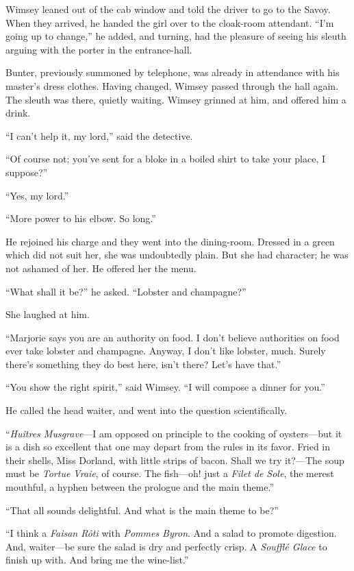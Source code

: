 Wimsey leaned out of the cab window and told the driver to go to the Savoy. When they arrived, he handed the girl over to the cloak-room attendant. \enquote{I'm going up to change,} he added, and turning, had the pleasure of seeing his sleuth arguing with the porter in the entrance-hall.

Bunter, previously summoned by telephone, was already in attendance with his master's dress clothes. Having changed, Wimsey passed through the hall again. The sleuth was there, quietly waiting. Wimsey grinned at him, and offered him a drink.

\enquote{I can't help it, my lord,} said the detective.

\enquote{Of course not; you've sent for a bloke in a boiled shirt to take your place, I suppose?}

\enquote{Yes, my lord.}

\enquote{More power to his elbow. So long.}

He rejoined his charge and they went into the dining-room. Dressed in a green which did not suit her, she was undoubtedly plain. But she had character; he was not ashamed of her. He offered her the menu.

\enquote{What shall it be?} he asked. \enquote{Lobster and champagne?}

She laughed at him.

\enquote{Marjorie says you are an authority on food. I don't believe authorities on food ever take lobster and champagne. Anyway, I don't like lobster, much. Surely there's something they do best here, isn't there? Let's have that.}

\enquote{You show the right spirit,} said Wimsey. \enquote{I will compose a dinner for you.}

He called the head waiter, and went into the question scientifically.

\enquote{\textit{Huîtres Musgrave}---I am opposed on principle to the cooking of oysters\allowbreak---\allowbreak but it is a dish so excellent that one may depart from the rules in its favor. Fried in their shells, Miss Dorland, with little strips of bacon. Shall we try it?---The soup must be \textit{Tortue Vraie}, of course. The fish\allowbreak---\allowbreak oh! just a \textit{Filet de Sole}, the merest mouthful, a hyphen between the prologue and the main theme.}

\enquote{That all sounds delightful. And what is the main theme to be?}

\enquote{I think a \textit{Faisan Rôti} with \textit{Pommes Byron}. And a salad to promote digestion. And, waiter\allowbreak---\allowbreak be sure the salad is dry and perfectly crisp. A \textit{Soufflé Glace} to finish up with. And bring me the wine-list.}

